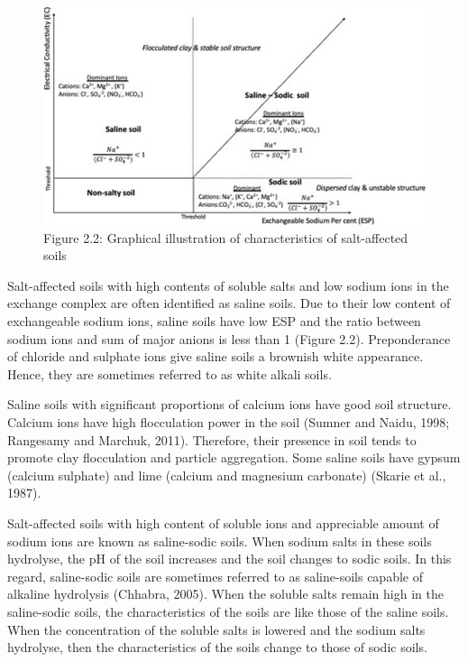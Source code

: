 \documentclass[
  10pt,
  b5paper,
]{book}
\begin{document}
\begin{figure}
\centering
\includegraphics{figures/images/Figure2.2.jpg}
\caption{Figure 2.2: Graphical illustration of characteristics of salt-affected soils}
\end{figure}

Salt-affected soils with high contents of soluble salts and low sodium ions in the exchange complex are often identified as saline soils. Due to their low content of exchangeable sodium ions, saline soils have low ESP and the ratio between sodium ions and sum of major anions is less than 1 (Figure 2.2). Preponderance of chloride and sulphate ions give saline soils a brownish white appearance. Hence, they are sometimes referred to as white alkali soils.

Saline soils with significant proportions of calcium ions have good soil structure. Calcium ions have high flocculation power in the soil (Sumner and Naidu, 1998; Rangesamy and Marchuk, 2011). Therefore, their presence in soil tends to promote clay flocculation and particle aggregation. Some saline soils have gypsum (calcium sulphate) and lime (calcium and magnesium carbonate) (Skarie et al., 1987).

Salt-affected soils with high content of soluble ions and appreciable amount of sodium ions are known as saline-sodic soils. When sodium salts in these soils hydrolyse, the pH of the soil increases and the soil changes to sodic soils. In this regard, saline-sodic soils are sometimes referred to as saline-soils capable of alkaline hydrolysis (Chhabra, 2005). When the soluble salts remain high in the saline-sodic soils, the characteristics of the soils are like those of the saline soils. When the concentration of the soluble salts is lowered and the sodium salts hydrolyse, then the characteristics of the soils change to those of sodic soils.
\end{document}
